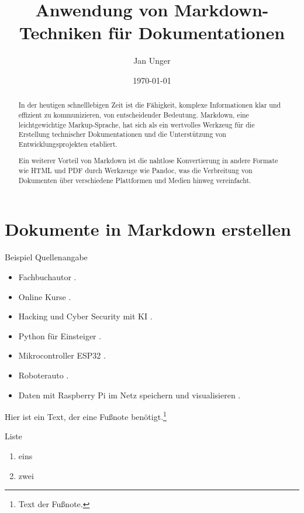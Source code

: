 \documentclass{vorlage-design-main}
\title{Anwendung von Markdown-Techniken für Dokumentationen}
\author{Jan Unger}
\date{\today}
\begin{document}
\maketitle

\begin{abstract}
In der heutigen schnelllebigen Zeit ist die Fähigkeit, komplexe
Informationen klar und effizient zu kommunizieren, von entscheidender
Bedeutung. Markdown, eine leichtgewichtige Markup-Sprache, hat sich als
ein wertvolles Werkzeug für die Erstellung technischer Dokumentationen
und die Unterstützung von Entwicklungsprojekten etabliert.

Ein weiterer Vorteil von Markdown ist die nahtlose Konvertierung in
andere Formate wie HTML und PDF durch Werkzeuge wie Pandoc, was die
Verbreitung von Dokumenten über verschiedene Plattformen und Medien
hinweg vereinfacht.
\end{abstract}

\section{Dokumente in Markdown
erstellen}\label{dokumente-in-markdown-erstellen}

Beispiel Quellenangabe

\begin{itemize}

\item
  Fachbuchautor \textcite{dalwigk:2024:fachbuchautor}.
\item
  Online Kurse \textcite{schaffranek:2024:kurse}.
\item
  Hacking und Cyber Security mit KI \textcite{dalwigk:2023:hacking}.
\item
  Python für Einsteiger \textcite{dalwigk:2022:python}.
\item
  Mikrocontroller ESP32 \textcite{brandes:2023:mikrocontroller}.
\item
  Roboterauto \textcite{brandes:2022:esp32}.
\item
  Daten mit Raspberry Pi im Netz speichern und visualisieren
  \textcite{brandes:2023:daten}.
\end{itemize}

Hier ist ein Text, der eine Fußnote benötigt.\footnote{Text der Fußnote.}

Liste

\begin{enumerate}
\def\labelenumi{\arabic{enumi}.}

\item
  eins
\item
  zwei
\end{enumerate}
\end{document}
